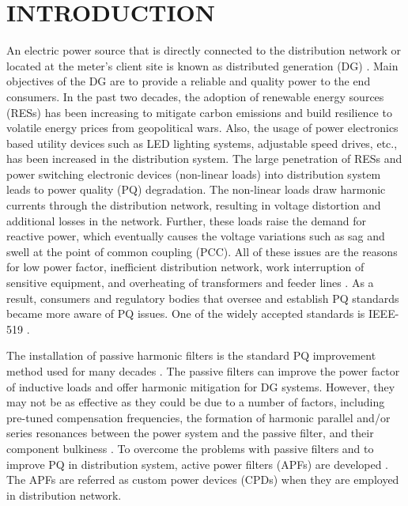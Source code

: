 \chapter{INTRODUCTION}
\label{1.Chap:Intro}
An electric power source that is directly connected to the distribution network or located at the meter's client site is known as distributed generation (DG) \cite{ACKERMANN2001195}. Main objectives of the DG are to provide a reliable and quality power to the end consumers. In the past two decades, the adoption of renewable energy sources (RESs) has been increasing to mitigate carbon emissions and build resilience to volatile energy prices from geopolitical wars. Also, the usage of power electronics based utility devices such as LED lighting systems, adjustable speed drives, etc., has been increased in the distribution system. The large penetration of RESs and power switching electronic devices (non-linear loads) into distribution system leads to power quality (PQ) degradation. The non-linear loads draw harmonic currents through the distribution network, resulting in voltage distortion and additional losses in the network. Further, these loads raise the demand for reactive power, which eventually causes the voltage variations such as sag and swell at the point of common coupling (PCC). All of these issues are the reasons for low power factor, inefficient distribution network, work interruption of sensitive equipment, and overheating of transformers and feeder lines \cite{ghosh2002power}. As a result, consumers and regulatory bodies that oversee and establish PQ standards became more aware of PQ issues. One of the widely accepted standards is IEEE-519 \cite{9848440}.  
 
 The installation of passive harmonic filters is the standard PQ improvement method used for many decades \cite{1268201}. The passive filters can improve the power factor of inductive loads and offer harmonic mitigation for DG systems. However, they may not be as effective as they could be due to a number of factors, including pre-tuned compensation frequencies, the formation of harmonic parallel and/or series resonances between the power system and the passive filter, and their component bulkiness \cite{1545766}. To overcome the problems with passive filters and to improve PQ in distribution system, active power filters (APFs) are developed \cite{4074559,1601573,gyugyi1976active,mohan1977active}. The APFs are referred as custom power devices (CPDs) when they are employed in distribution network. 
 
